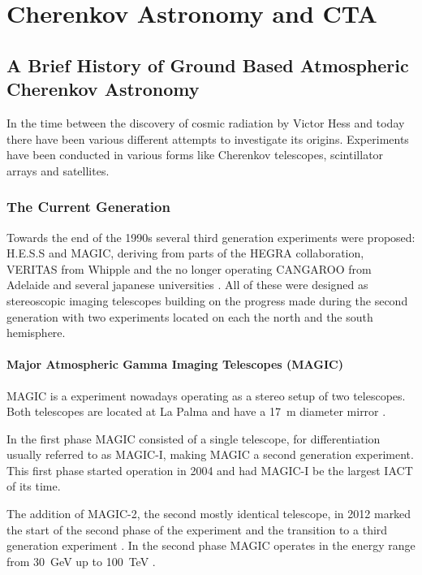 \chapter{Cherenkov Astronomy and CTA}
\label{cta}


\section{A Brief History of Ground Based Atmospheric Cherenkov Astronomy}
In the time between the discovery of cosmic radiation by Victor Hess
and today there have been various different attempts to investigate its origins.
Experiments have been conducted in various forms like Cherenkov telescopes, scintillator 
arrays and satellites.


\subsection{The Current Generation}

Towards the end of the 1990s several third generation experiments were
proposed:
H.E.S.S and MAGIC, deriving from parts of the HEGRA collaboration, 
VERITAS from Whipple and the no longer operating CANGAROO from Adelaide and 
several japanese universities \cite{HILLAS201319}. All of these
were designed as stereoscopic imaging telescopes building on the progress made during the 
second generation with two experiments located on each the north and the south hemisphere.

\subsubsection{Major Atmospheric Gamma Imaging Telescopes (MAGIC)}
MAGIC is a experiment nowadays operating as a stereo setup of two telescopes.
Both telescopes are located at La Palma and have a \SI{17}{\meter} diameter mirror \cite{ALEKSIC201676}.

In the first phase MAGIC consisted of a single telescope, for differentiation usually
referred to as MAGIC-I, making MAGIC a second generation experiment. This first phase started 
operation in 2004 and had MAGIC-I be the largest IACT of its time.

The addition of MAGIC-2, the second mostly identical telescope, in 2012 marked the 
start of the second phase of the experiment and the transition to a third 
generation experiment \cite{2009arXiv0907.1211C}.
In the second phase MAGIC operates in the energy range from \SI{30}{\giga\eV}
up to \SI{100}{\TeV} \cite{magic_website}.

